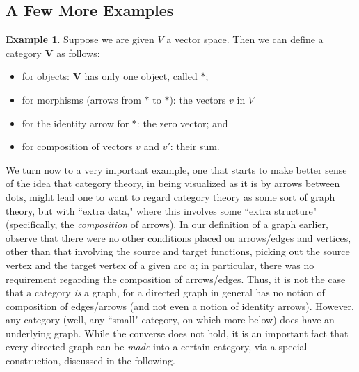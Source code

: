 \documentclass[a4paper]{book}
\theoremstyle{definition}
\newtheorem{example}{Example}[section]
\theoremstyle{definition}
\theoremstyle{definition}
\theoremstyle{theorem}
\theoremstyle{definition}
\begin{document}
\subsection{A Few More Examples}
\begin{example}
 	Suppose we are given $V$ a vector space. Then we can define a category $\textbf{V}$ as follows: 
 	\begin{itemize}
 		\item for objects: \textbf{V} has only one object, called $*$; 
 		\item for morphisms (arrows from $*$ to $*$): the vectors $v$ in $V$
 		\item for the identity arrow for $*$: the zero vector; and 
 		\item for composition of vectors $v$ and $v'$: their sum.  
 	\end{itemize} 
\end{example}
We turn now to a very important example, one that starts to make better sense of the idea that category theory, in being visualized as it is by arrows between dots, might lead one to want to regard category theory as some sort of graph theory, but with ``extra data," where this involves some ``extra structure" (specifically, the \textit{composition} of arrows). In our definition of a graph earlier, observe that there were no other conditions placed on arrows/edges and vertices, other than that involving the source and target functions, picking out the source vertex and the target vertex of a given arc $a$; in particular, there was no requirement regarding the composition of arrows/edges. Thus, it is not the case that a category \textit{is} a graph, for a directed graph in general has no notion of composition of edges/arrows (and not even a notion of identity arrows). However, any category (well, any ``small" category, on which more below) does have an underlying graph. While the converse does not hold, it is an important fact that every directed graph can be \textit{made} into a certain category, via a special construction, discussed in the following.     
\end{document}
